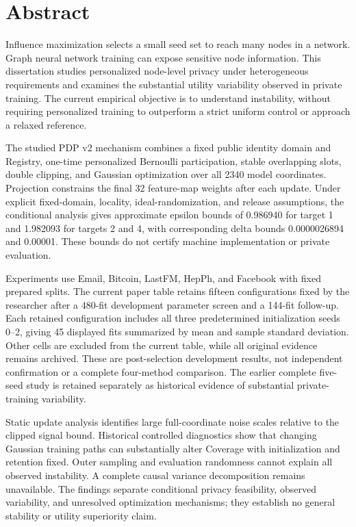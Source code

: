 \chapter*{Abstract}
Influence maximization selects a small seed set to reach many nodes in a network. Graph neural network training can expose sensitive node information. This dissertation studies personalized node-level privacy under heterogeneous requirements and examines the substantial utility variability observed in private training. The current empirical objective is to understand instability, without requiring personalized training to outperform a strict uniform control or approach a relaxed reference.

The studied PDP v2 mechanism combines a fixed public identity domain and Registry, one-time personalized Bernoulli participation, stable overlapping slots, double clipping, and Gaussian optimization over all 2340 model coordinates. Projection constrains the final 32 feature-map weights after each update. Under explicit fixed-domain, locality, ideal-randomization, and release assumptions, the conditional analysis gives approximate epsilon bounds of 0.986940 for target 1 and 1.982093 for targets 2 and 4, with corresponding delta bounds 0.0000026894 and 0.00001. These bounds do not certify machine implementation or private evaluation.

Experiments use Email, Bitcoin, LastFM, HepPh, and Facebook with fixed prepared splits. The current paper table retains fifteen configurations fixed by the researcher after a 480-fit development parameter screen and a 144-fit follow-up. Each retained configuration includes all three predetermined initialization seeds 0--2, giving 45 displayed fits summarized by mean and sample standard deviation. Other cells are excluded from the current table, while all original evidence remains archived. These are post-selection development results, not independent confirmation or a complete four-method comparison. The earlier complete five-seed study is retained separately as historical evidence of substantial private-training variability.

Static update analysis identifies large full-coordinate noise scales relative to the clipped signal bound. Historical controlled diagnostics show that changing Gaussian training paths can substantially alter Coverage with initialization and retention fixed. Outer sampling and evaluation randomness cannot explain all observed instability. A complete causal variance decomposition remains unavailable. The findings separate conditional privacy feasibility, observed variability, and unresolved optimization mechanisms; they establish no general stability or utility superiority claim.
\clearpage
